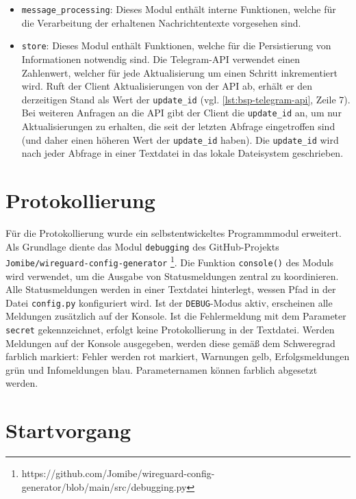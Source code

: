 \begin{itemize}
\item \lstinline{message_processing}: Dieses Modul enthält interne Funktionen, welche für die Verarbeitung der erhaltenen Nachrichtentexte vorgesehen sind. 
\item \lstinline{store}: Dieses Modul enthält Funktionen, welche für die Persistierung von Informationen notwendig sind. Die Telegram-API verwendet einen Zahlenwert, welcher für jede Aktualisierung um einen Schritt inkrementiert wird. Ruft der Client Aktualisierungen von der API ab, erhält er den derzeitigen Stand als Wert der \lstinline{update_id} (vgl. \autoref{lst:bsp-telegram-api}, Zeile 7). Bei weiteren Anfragen an die API gibt der Client die \lstinline{update_id} an, um nur Aktualisierungen zu erhalten, die seit der letzten Abfrage eingetroffen sind (und daher einen höheren Wert der \lstinline{update_id} haben). Die \lstinline{update_id} wird nach jeder Abfrage in einer Textdatei in das lokale Dateisystem geschrieben.
\end{itemize}

\section{Protokollierung}
\label{sec:protokollierung}

Für die Protokollierung wurde ein selbstentwickeltes Programmmodul erweitert. Als Grundlage diente das Modul \lstinline{debugging} des GitHub-Projekts \lstinline{Jomibe/wireguard-config-generator} \footnote{https://github.com/Jomibe/wireguard-config-generator/blob/main/src/debugging.py}. Die Funktion \lstinline{console()} des Moduls wird verwendet, um die Ausgabe von Statusmeldungen zentral zu koordinieren. Alle Statusmeldungen werden in einer Textdatei hinterlegt, wessen Pfad in der Datei \lstinline{config.py} konfiguriert wird. Ist der \lstinline{DEBUG}-Modus aktiv, erscheinen alle Meldungen zusätzlich auf der Konsole. Ist die Fehlermeldung mit dem Parameter \lstinline{secret} gekennzeichnet, erfolgt keine Protokollierung in der Textdatei. Werden Meldungen auf der Konsole ausgegeben, werden diese gemäß dem Schweregrad farblich markiert: Fehler werden rot markiert, Warnungen gelb, Erfolgsmeldungen grün und Infomeldungen blau. Parameternamen können farblich abgesetzt werden.

\section{Startvorgang}
\label{sec:startvorgang}

